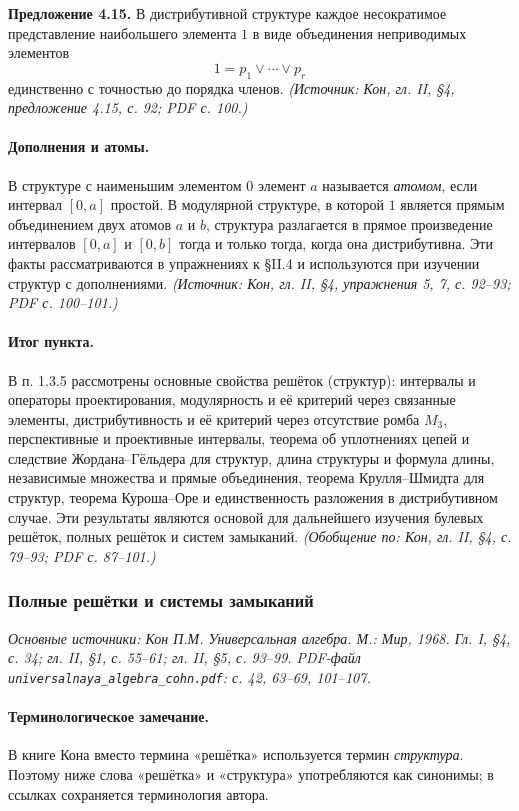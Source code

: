 \documentclass[a4paper,12pt]{article}
\begin{document}
\textbf{Предложение 4.15.} В дистрибутивной структуре каждое несократимое представление наибольшего элемента \(1\) в виде объединения неприводимых элементов
\[
1=p_1\vee\cdots\vee p_r
\]
единственно с точностью до порядка членов.
\textit{(Источник: Кон, гл. II, §4, предложение 4.15, с. 92; PDF с. 100.)}

\paragraph{Дополнения и атомы.}
В структуре с наименьшим элементом \(0\) элемент \(a\) называется \emph{атомом}, если интервал \([0,a]\) простой. В модулярной структуре, в которой \(1\) является прямым объединением двух атомов \(a\) и \(b\), структура разлагается в прямое произведение интервалов \([0,a]\) и \([0,b]\) тогда и только тогда, когда она дистрибутивна. Эти факты рассматриваются в упражнениях к §II.4 и используются при изучении структур с дополнениями.
\textit{(Источник: Кон, гл. II, §4, упражнения 5, 7, с. 92--93; PDF с. 100--101.)}

\paragraph{Итог пункта.}
В п. 1.3.5 рассмотрены основные свойства решёток (структур): интервалы и операторы проектирования, модулярность и её критерий через связанные элементы, дистрибутивность и её критерий через отсутствие ромба \(M_3\), перспективные и проективные интервалы, теорема об уплотнениях цепей и следствие Жордана--Гёльдера для структур, длина структуры и формула длины, независимые множества и прямые объединения, теорема Крулля--Шмидта для структур, теорема Куроша--Оре и единственность разложения в дистрибутивном случае. Эти результаты являются основой для дальнейшего изучения булевых решёток, полных решёток и систем замыканий.
\textit{(Обобщение по: Кон, гл. II, §4, с. 79--93; PDF с. 87--101.)}

\subsubsection{Полные решётки и системы замыканий}

\noindent\textit{Основные источники: Кон П.М. Универсальная алгебра. М.: Мир, 1968. Гл. I, §4, с. 34; гл. II, §1, с. 55--61; гл. II, §5, с. 93--99. PDF-файл \texttt{universalnaya\_algebra\_cohn.pdf}: с. 42, 63--69, 101--107.}

\paragraph{Терминологическое замечание.}
В книге Кона вместо термина «решётка» используется термин \emph{структура}. Поэтому ниже слова «решётка» и «структура» употребляются как синонимы; в ссылках сохраняется терминология автора.
\end{document}

